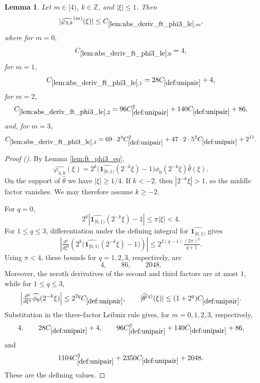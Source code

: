 \documentclass[12pt,reqno]{amsart}
\newcommand{\auto}{{({\tiny\faCar})}}
\theoremstyle{plain}
\newtheorem{lemma}[theorem]{Lemma}
\numberwithin{equation}{section}
\theoremstyle{remark}
\newcommand{\uses}[1]{}
\newcommand{\usesdefs}[1]{}
\newcommand{\Z}{{\mathbb Z}}
\begin{document}
\begin{lemma}\label{lem:abs_deriv_ft_phi3_le}\uses{lem:ft_phi3_eq}\usesdefs{def:cn-window,def:unipair,defn:window based bump functions}
Let $m\in[4)$, $k\in\Z$, and $|\xi|\le1$. Then
\begin{equation}\label{auto:varphi-three-Fourier-derivative-bound}
|\widehat{\varphi_{3,k}}^{(m)}(\xi)|
\le C_{\ref{lem:abs_deriv_ft_phi3_le},m},
\end{equation}
where for $m=0$,
\begin{equation}\label{auto:varphi-three-Fourier-derivative-constant}
C_{\ref{lem:abs_deriv_ft_phi3_le},0}=4,
\end{equation}
for $m=1$,
\begin{equation}\label{auto:varphi-three-Fourier-derivative-constant-one}
C_{\ref{lem:abs_deriv_ft_phi3_le},1}=28C_{\ref{def:unipair}}+4,
\end{equation}
for $m=2$,
\begin{equation}\label{auto:varphi-three-Fourier-derivative-constant-two}
C_{\ref{lem:abs_deriv_ft_phi3_le},2}=96C_{\ref{def:unipair}}^2+140C_{\ref{def:unipair}}+86,
\end{equation}
and, for $m=3$,
\begin{equation}\label{auto:varphi-three-Fourier-derivative-constant-three}
C_{\ref{lem:abs_deriv_ft_phi3_le},3}=69\cdot2^4C_{\ref{def:unipair}}^2+47\cdot2\cdot5^2C_{\ref{def:unipair}}+2^{11}.
\end{equation}
\end{lemma}
\begin{proof}[Proof \auto]
By Lemma \ref{lem:ft_phi3_eq},
\[
\widehat{\varphi_{3,k}}(\xi)
=
2^k\bigl(\widehat{\mathbf1_{[0,1)}}(2^{-k}\xi)-1\bigr)
\widehat{\phi_0}(2^{-k}\xi)\widehat\theta(\xi).
\]
On the support of $\widehat\theta$ we have $|\xi|\ge1/4$. If $k<-2$, then $|2^{-k}\xi|>1$, so the middle factor vanishes. We may therefore assume $k\ge-2$.

For $q=0$,
\[
2^k|\widehat{\mathbf1_{[0,1)}}(2^{-k}\xi)-1|
\le\pi|\xi|<4.
\]
For $1\le q\le3$, differentiation under the defining integral for $\widehat{\mathbf1_{[0,1)}}$ gives
\[
\left|\tfrac{d^q}{d\xi^q}
\left(2^k\bigl(\widehat{\mathbf1_{[0,1)}}(2^{-k}\xi)-1\bigr)\right)\right|
\le2^{2(q-1)}\tfrac{(2\pi)^q}{q+1}.
\]
Using $\pi<4$, these bounds for $q=1,2,3$, respectively, are
\[
4,
\qquad
86,
\qquad
2048.
\]
Moreover, the zeroth derivatives of the second and third factors are at most $1$, while for $1\le q\le3$,
\[
\left|\tfrac{d^q}{d\xi^q}\widehat{\phi_0}(2^{-k}\xi)\right|
\le2^{2q}C_{\ref{def:unipair}},
\qquad
|\widehat\theta^{(q)}(\xi)|\le(1+2^q)C_{\ref{def:unipair}}.
\]
Substitution in the three-factor Leibniz rule gives, for $m=0,1,2,3$, respectively,
\[
4,
\qquad
28C_{\ref{def:unipair}}+4,
\qquad
96C_{\ref{def:unipair}}^2+140C_{\ref{def:unipair}}+86,
\]
and
\[
1104C_{\ref{def:unipair}}^2+2350C_{\ref{def:unipair}}+2048.
\]
These are the defining values.
\end{proof}
\end{document}
